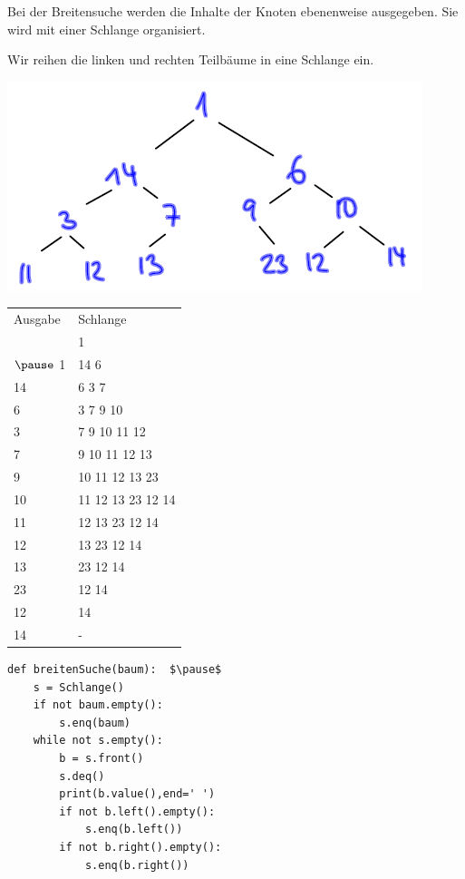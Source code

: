 \documentclass{beamer}
\begin{document}
\begin{frame}[fragile]
\begin{minipage}[c]{7cm}
Bei der Breitensuche werden die Inhalte der Knoten ebenenweise ausgegeben. Sie wird mit einer Schlange organisiert.   

Wir reihen die linken und rechten Teilbäume in eine Schlange ein.  

 \includegraphics[scale=0.6]{bild12.png}   

\end{minipage} 
\begin{minipage}[c]{4cm}
\begin{tabular}{l l}
Ausgabe & Schlange \\  
 & 1 \\  $\pause$
1 & 14 6 \\
14 & 6 3 7 \\
6 & 3 7 9 10 \\
3 & 7 9 10 11 12 \\
7 & 9 10 11 12 13 \\
9 & 10 11 12 13 23  \\
10 & 11 12 13 23 12 14 \\
11 & 12 13 23 12 14 \\
12  & 13 23 12 14 \\
13 & 23 12 14 \\
23 &  12 14 \\
12 & 14 \\
14 & -
\end{tabular}
\end{minipage} 
\end{frame}

\begin{frame}[fragile]
\begin{lstlisting}
def breitenSuche(baum):  $\pause$
    s = Schlange()
    if not baum.empty():
        s.enq(baum)
    while not s.empty():
        b = s.front()
        s.deq()
        print(b.value(),end=' ')
        if not b.left().empty():
            s.enq(b.left())
        if not b.right().empty():
            s.enq(b.right())
\end{lstlisting} 
\end{frame}


 
\end{document}

